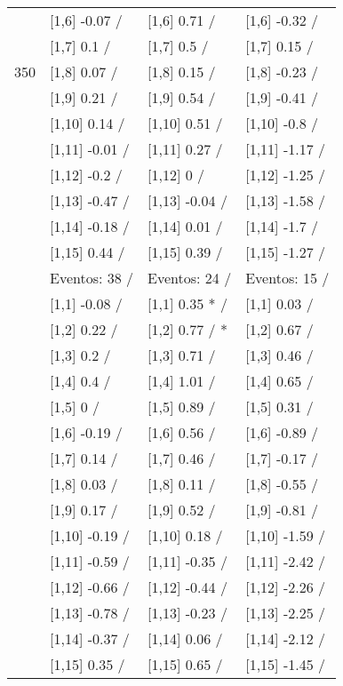 \begin{table}
\begin{tabular}[t]{llll}
 & {}[1,6] -0.07  / & {}[1,6] 0.71  / & {}[1,6] -0.32  /\\
 & {}[1,7] 0.1  / & {}[1,7] 0.5  / & {}[1,7] 0.15  /\\
350 & {}[1,8] 0.07  / & {}[1,8] 0.15  / & {}[1,8] -0.23  /\\
\addlinespace
 & {}[1,9] 0.21  / & {}[1,9] 0.54  / & {}[1,9] -0.41  /\\
 & {}[1,10] 0.14  / & {}[1,10] 0.51  / & {}[1,10] -0.8  /\\
 & {}[1,11] -0.01  / & {}[1,11] 0.27  / & {}[1,11] -1.17  /\\
 & {}[1,12] -0.2  / & {}[1,12] 0  / & {}[1,12] -1.25  /\\
 & {}[1,13] -0.47  / & {}[1,13] -0.04  / & {}[1,13] -1.58  /\\
\addlinespace
 & {}[1,14] -0.18  / & {}[1,14] 0.01  / & {}[1,14] -1.7  /\\
 & {}[1,15] 0.44  / & {}[1,15] 0.39  / & {}[1,15] -1.27  /\\
 & Eventos:  38 / & Eventos:  24 / & Eventos:  15 /\\
 & {}[1,1] -0.08  / & {}[1,1] 0.35 * / & {}[1,1] 0.03  /\\
 & {}[1,2] 0.22  / & {}[1,2] 0.77  / * & {}[1,2] 0.67  /\\
\addlinespace
 & {}[1,3] 0.2  / & {}[1,3] 0.71  / & {}[1,3] 0.46  /\\
 & {}[1,4] 0.4  / & {}[1,4] 1.01  / & {}[1,4] 0.65  /\\
 & {}[1,5] 0  / & {}[1,5] 0.89  / & {}[1,5] 0.31  /\\
 & {}[1,6] -0.19  / & {}[1,6] 0.56  / & {}[1,6] -0.89  /\\
 & {}[1,7] 0.14  / & {}[1,7] 0.46  / & {}[1,7] -0.17  /\\
\addlinespace
500 & {}[1,8] 0.03  / & {}[1,8] 0.11  / & {}[1,8] -0.55  /\\
 & {}[1,9] 0.17  / & {}[1,9] 0.52  / & {}[1,9] -0.81  /\\
 & {}[1,10] -0.19  / & {}[1,10] 0.18  / & {}[1,10] -1.59  /\\
 & {}[1,11] -0.59  / & {}[1,11] -0.35  / & {}[1,11] -2.42  /\\
 & {}[1,12] -0.66  / & {}[1,12] -0.44  / & {}[1,12] -2.26  /\\
\addlinespace
 & {}[1,13] -0.78  / & {}[1,13] -0.23  / & {}[1,13] -2.25  /\\
 & {}[1,14] -0.37  / & {}[1,14] 0.06  / & {}[1,14] -2.12  /\\
 & {}[1,15] 0.35  / & {}[1,15] 0.65  / & {}[1,15] -1.45  /\\
\bottomrule
\end{tabular}
\end{table}
